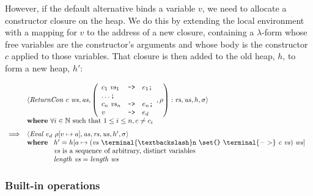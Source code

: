 \documentclass[10pt,a4paper]{exam} %
\begin{document}
However, if the default alternative binds a variable $v$, we need to allocate a constructor closure on the heap. We do this by extending the local environment with a mapping for $v$ to the address of a new closure, containing a $\lambda$-form whose free variables are the constructor's arguments and whose body is the constructor $c$ applied to those variables. That closure is then added to the old heap, $h$, to form a new heap, $h'$: 
\begin{mdframed}
\begin{equation}
\begin{array}{cl}
 & \langle \mathit{ReturnCon}~c~\mathit{ws}, \mathit{as}, \left(\begin{array}{lcl}
 c_1~\mathit{vs}_1 & \texttt{->} & e_1 \texttt{;} \\
 \multicolumn{3}{l}{\ldots \texttt{;}} \\
 c_n~\mathit{vs}_n & \texttt{->} & e_n \texttt{;} \\
 v & \texttt{->} & e_d
 \end{array}, \rho\right) : \mathit{rs}, \mathit{us}, h, \sigma \rangle \\
 & \mathbf{where}~\forall i \in \mathbb{N}~\text{such that}~1 \leq i \leq n, c \neq c_i \\[0.25cm]
\Longrightarrow & \langle \mathit{Eval}~e_d~\rho[v \mapsto a], \mathit{as}, \mathit{rs}, \mathit{us}, h', \sigma \rangle\\
 & \mathbf{where}~\begin{array}[t]{l}
 h' = h[a \mapsto (\mathit{vs}~\terminal{\textbackslash}\texttt{n}~\texttt{\set{}}~\terminal{->}~\mathit{c}~\mathit{vs})~\mathit{ws}] \\
 \mathit{vs}~\text{is a sequence of arbitrary, distinct variables} \\
 \mathit{length}~\mathit{vs} = \mathit{length}~\mathit{ws}
 \end{array}
\end{array}
\end{equation}
\end{mdframed}

\subsubsection{Built-in operations}
\end{document}

